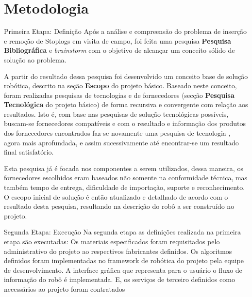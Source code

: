 
\setcounter{secnumdepth}{3}
\section{Metodologia}
\label{metodologia}

Primeira Etapa: Definição 
Após a análise e compreensão do problema de inserção e remoção de Stoplogs em visita de campo, foi feita uma pesquisa
\textbf{Pesquisa Bibliográfica} e \emph{brainstorm} com o objetivo de alcançar um conceito sólido de solução ao problema. 

A partir do resultado dessa pesquisa foi desenvolvido um conceito base de solução robótica, descrito na seção {\bf Escopo} do projeto básico. Baseado neste conceito, foram realizadas pesquisas de tecnologias e de fornecedores (secção  {\bf Pesquisa Tecnológica} do projeto básico) de forma recursiva e convergente com relação aos resultados. Isto
é, com base nas pesquisas de solução tecnológicas possíveis, buscam-se fornecedores compatíveis e com o
resultado e informação dos produtos dos fornecedores encontrados faz-se
novamente uma pesquisa de tecnologia	, agora mais aprofundada, e assim sucessivamente
até encontrar-se um resultado final satisfatório. 

Esta pesquisa já é focada nos
componentes a serem utilizados, dessa maneira, os fornecedores escolhidos eram
baseados não somente na conformidade técnica, mas também tempo de entrega,
dificuldade de importação, suporte e reconhecimento. O escopo inicial de solução
é então atualizado e detalhado de acordo com o resultado desta pesquisa, resultando na descrição do robô a ser construído no projeto.

Segunda Etapa: Execução
Na segunda etapa as definições realizada na primeira etapa são executadas: 
Os materiais especificados foram requisitados pelo administrativo do projeto ao respectivos fabricantes definidos.
Os algoritmos definidos foram implementadas no framework de robótica do projeto pela equipe de desenvolvimento.
A interface gráfica que representa para o usuário o fluxo de informação do robô é implementada. 
E, os serviços de terceiro definidos como necessários ao projeto foram contratados  
